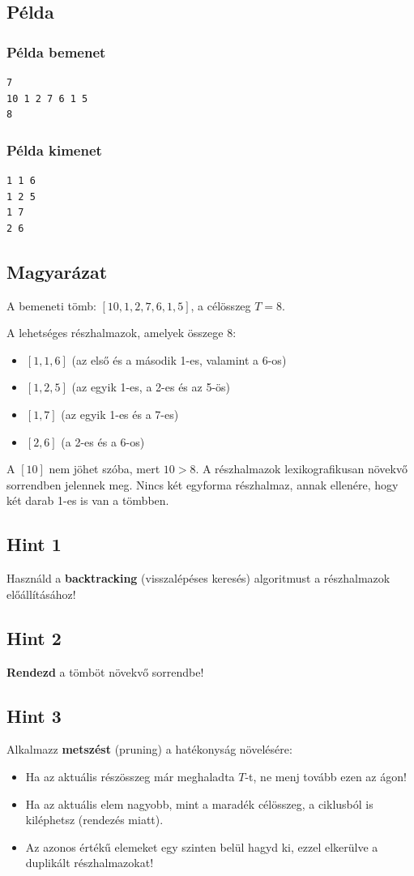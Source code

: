 \documentclass[12pt,a4paper]{article}
\begin{document}
\subsection*{Példa}

\subsubsection*{Példa bemenet}
\begin{verbatim}
7
10 1 2 7 6 1 5
8
\end{verbatim}

\subsubsection*{Példa kimenet}
\begin{verbatim}
1 1 6
1 2 5
1 7
2 6
\end{verbatim}

\subsection*{Magyarázat}

A bemeneti tömb: $[10, 1, 2, 7, 6, 1, 5]$, a célösszeg $T = 8$.

A lehetséges részhalmazok, amelyek összege $8$:
\begin{itemize}
    \item $[1, 1, 6]$ (az első és a második 1-es, valamint a 6-os)
    \item $[1, 2, 5]$ (az egyik 1-es, a 2-es és az 5-ös)
    \item $[1, 7]$ (az egyik 1-es és a 7-es)
    \item $[2, 6]$ (a 2-es és a 6-os)
\end{itemize}

A $[10]$ nem jöhet szóba, mert $10 > 8$. A részhalmazok lexikografikusan növekvő sorrendben jelennek meg. Nincs két egyforma részhalmaz, annak ellenére, hogy két darab 1-es is van a tömbben.

\subsection*{Hint 1}
Használd a \textbf{backtracking} (visszalépéses keresés) algoritmust a részhalmazok előállításához!
\subsection*{Hint 2}
\textbf{Rendezd} a tömböt növekvő sorrendbe!
\subsection*{Hint 3}
Alkalmazz \textbf{metszést} (pruning) a hatékonyság növelésére:
\begin{itemize}
    \item Ha az aktuális részösszeg már meghaladta $T$-t, ne menj tovább ezen az ágon!
    \item Ha az aktuális elem nagyobb, mint a maradék célösszeg, a ciklusból is kiléphetsz (rendezés miatt).
    \item Az azonos értékű elemeket egy szinten belül hagyd ki, ezzel elkerülve a duplikált részhalmazokat!
\end{itemize}
\end{document}
